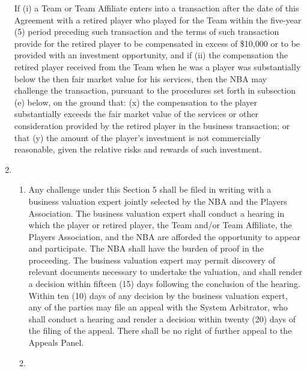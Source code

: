 \documentclass[
]{book}
\providecommand{\tightlist}{%
  \setlength{\itemsep}{0pt}\setlength{\parskip}{0pt}}
\begin{document}
\begin{enumerate}
  If (i) a Team or Team Affiliate enters into a transaction after the date of this Agreement with a retired player who played for the Team within the five-year (5) period preceding such transaction and the terms of such transaction provide for the retired player to be compensated in excess of \$10,000 or to be provided with an investment opportunity, and if (ii) the compensation the retired player received from the Team when he was a player was substantially below the then fair market value for his services, then the NBA may challenge the transaction, pursuant to the procedures set forth in subsection (e) below, on the ground that: (x) the compensation to the player substantially exceeds the fair market value of the services or other consideration provided by the retired player in the business transaction; or that (y) the amount of the player's investment is not commercially reasonable, given the relative risks and rewards of such investment.
\item
  \begin{enumerate}
  \def\labelenumii{(\roman{enumii})}
  \tightlist
  \item
    Any challenge under this Section 5 shall be filed in writing with a business valuation expert jointly selected by the NBA and the Players Association. The business valuation expert shall conduct a hearing in which the player or retired player, the Team and/or Team Affiliate, the Players Association, and the NBA are afforded the opportunity to appear and participate. The NBA shall have the burden of proof in the proceeding. The business valuation expert may permit discovery of relevant documents necessary to undertake the valuation, and shall render a decision within fifteen (15) days following the conclusion of the hearing. Within ten (10) days of any decision by the business valuation expert, any of the parties may file an appeal with the System Arbitrator, who shall conduct a hearing and render a decision within twenty (20) days of the filing of the appeal. There shall be no right of further appeal to the Appeals Panel.
  \item

\end{enumerate}
\end{enumerate}
\end{document}
